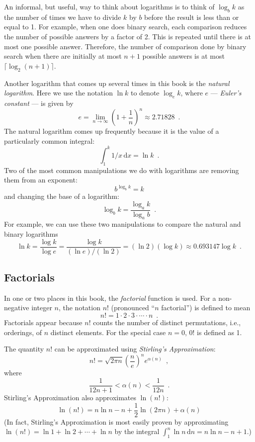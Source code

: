 An informal, but useful, way to think about logarithms is to think of $\log_b k$ as the number of times we have to divide $k$ by $b$ before the result is less than or equal to 1.  For example, when one does binary search, each comparison reduces the number of possible answers by a factor of 2.  This is repeated until there is at most one possible answer.  Therefore, the number of comparison done by binary search when there are initially at most $n+1$ possible answers is at most $\lceil\log_2(n+1)\rceil$.

Another logarithm that comes up several times in this book is the \emph{natural logarithm}.  Here we use the notation $\ln k$ to denote $\log_e k$, where $e$ --- \emph{Euler's constant} --- is given by  
\[
   e = \lim_{n\rightarrow\infty} \left(1+\frac{1}{n}\right)^n
   \approx  2.71828 \enspace .
\]
The natural logarithm comes up frequently because it is the value of a particularly common integral:
\[
    \int_{1}^{k} 1/x\,\mathrm{d}x  = \ln k \enspace .
\]
Two of the most common manipulations we do with logarithms are removing them from an exponent:
\[
    b^{\log_b k} = k
\]
and changing the base of a logarithm:
\[
    \log_b k = \frac{\log_a k}{\log_a b} \enspace .
\]
For example, we can use these two manipulations to compare the natural and binary logarithms
\[
   \ln k = \frac{\log k}{\log e} = \frac{\log k}{(\ln e)/(\ln 2)} = 
    (\ln 2)(\log k) \approx 0.693147\log k \enspace .
\]

\subsection{Factorials}

In one or two places in this book, the \emph{factorial} function is used.  For a non-negative integer $n$, the notation $n!$ (pronounced ``$n$ factorial'') is defined to mean 
\[
   n! = 1\cdot2\cdot3\cdot\cdots\cdot n \enspace .
\]
Factorials appear because $n!$ counts the number of distinct permutations, i.e., orderings, of $n$ distinct elements.   For the special case $n=0$, $0!$ is defined as 1. 

 The quantity $n!$ can be approximated using \emph{Stirling's Approximation}:
\[
	n! 
   = \sqrt{2\pi n}\left(\frac{n}{e}\right)^{n}e^{\alpha(n)} \enspace ,
\]
where
\[  
   \frac{1}{12n+1} <  \alpha(n) < \frac{1}{12n}  \enspace .
\]
Stirling's Approximation also approximates $\ln(n!)$:
\[
   \ln(n!) = n\ln n - n + \frac{1}{2}\ln(2\pi n) + \alpha(n)
\]
(In fact, Stirling's Approximation is most easily proven by approximating
$\ln(n!)=\ln 1 + \ln 2  + \cdots + \ln n$ by the integral
$\int_1^n \ln n\,\mathrm{d}n = n\ln n - n +1$.)

